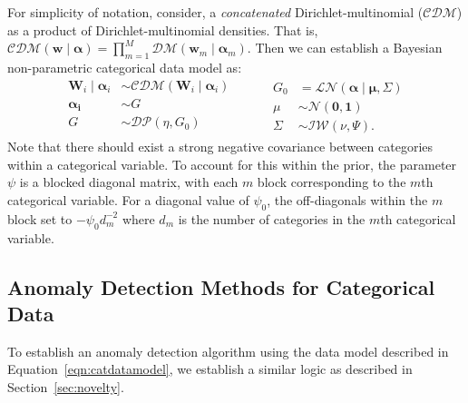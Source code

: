   For simplicity of notation, consider, a \emph{concatenated} Dirichlet-multinomial 
  ($\mathcal{CDM}$) as a product of Dirichlet-multinomial densities.  That is, 
  $\mathcal{CDM}(\bm{w}\mid\bm{\alpha}) = \prod_{m = 1}^M\mathcal{DM}(\bm{w}_m\mid\bm{\alpha}_m)$.
  Then we can establish a Bayesian non-parametric categorical data model as:
  \begin{equation}
    \label{eqn:catdatamodel}
    \begin{aligned}
      \bm{W}_i \mid \bm{\alpha}_i &\sim \mathcal{CDM}\left(\bm{W}_i\mid\bm{\alpha}_i\right)\\
      \bm{\alpha_i} &\sim G\\
      G &\sim \mathcal{DP}\left(\eta, G_0\right)\\
    \end{aligned}
    ~\hspace{1cm}
    \begin{aligned}
    G_0 &= \mathcal{LN}\left(\bm{\alpha}\mid\bm{\mu},\Sigma\right)\\
    \mu &\sim \mathcal{N}\left(\bm{0},\bm{1}\right)\\
    \Sigma &\sim \mathcal{IW}\left(\nu, \Psi\right).
    \end{aligned}
  \end{equation}
  Note that there should exist a strong negative covariance between categories 
  within a categorical variable.  To account for this within the prior, the 
  parameter $\psi$ is a blocked diagonal matrix, with each $m$ block 
  corresponding to the $m$th categorical variable.  For a diagonal value of 
  $\psi_0$, the off-diagonals within the $m$ block set to $-\psi_0 d_m^{-2}$ 
  where $d_m$ is the number of categories in the $m$th categorical variable.

\subsection{Anomaly Detection Methods for Categorical Data}
To establish an anomaly detection algorithm using the data model described in 
  Equation~\ref{eqn:catdatamodel}, we establish a similar logic as described in
  Section~\ref{sec:novelty}.  






